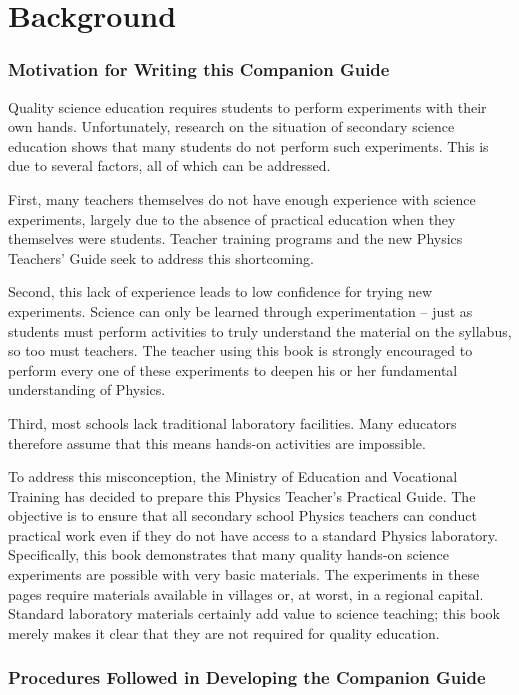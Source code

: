 \chapter*{Background}

\subsection*{Motivation for Writing this Companion Guide}

Quality science education requires students to perform experiments with their own hands. Unfortunately, research on the situation of secondary science education shows that many students do not perform such experiments. This is due to several factors, all of which can be addressed.

First, many teachers themselves do not have enough experience with science experiments, largely due to the absence of practical education when they themselves were students. Teacher training programs and the new Physics Teachers' Guide seek to address this shortcoming.

Second, this lack of experience leads to low confidence for trying new experiments. Science can only be learned through experimentation -- just as students must perform activities to truly understand the material on the syllabus, so too must teachers. The teacher using this book is strongly encouraged to perform every one of these experiments to deepen his or her fundamental understanding of Physics.

Third, most schools lack traditional laboratory facilities. Many educators therefore assume that this means hands-on activities are impossible.

To address this misconception, the Ministry of Education and Vocational Training has decided to prepare this Physics Teacher's Practical Guide. The objective is to ensure that all secondary school Physics teachers can conduct practical work even if they do not have access to a standard Physics laboratory. Specifically, this book demonstrates that many quality hands-on science experiments are possible with very basic materials. The experiments in these pages require materials available in villages or, at worst, in a regional capital. Standard laboratory materials certainly add value to science teaching; this book merely makes it clear that they are not required for quality education.

\subsection*{Procedures Followed in Developing the Companion Guide}

